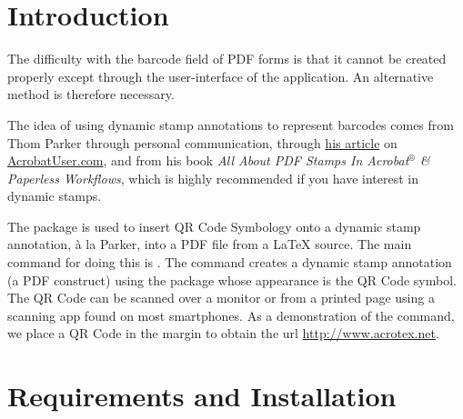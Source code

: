 \documentclass{article}
\begin{document}
\maketitle

\tableofcontents
{}


\section{Introduction}

The difficulty with the barcode field of PDF forms is that it cannot be
created properly except through the user-interface of the 
application. An alternative method is therefore necessary.

The idea of using dynamic stamp annotations to represent barcodes comes from
Thom Parker through personal communication, through
\href{https://acrobatusers.com/tutorials/print/dynamic_stamp_secrets}{his
article} on \href{https://acrobatusers.com/}{AcrobatUser.com}, and from
his book
\textsl{
{All About PDF Stamps In Acrobat${}^{\circledR}$ \& Paperless
Workflows}}, which is highly recommended if you have interest in dynamic
stamps.



The  package is used to insert QR Code Symbology onto a
dynamic stamp annotation, \`a la Parker, into a PDF file from a {\LaTeX}
source. The main command for doing this is
.
The command creates a dynamic stamp annotation (a PDF construct) using the
 package whose appearance is the QR Code symbol. The QR Code
can be scanned over a monitor or from a printed page using a scanning app
found on most smartphones.
As a demonstration of the  command, we place a QR Code in the
margin to obtain the url \url{http://www.acrotex.net}.


\section{Requirements and Installation}
\end{document}
